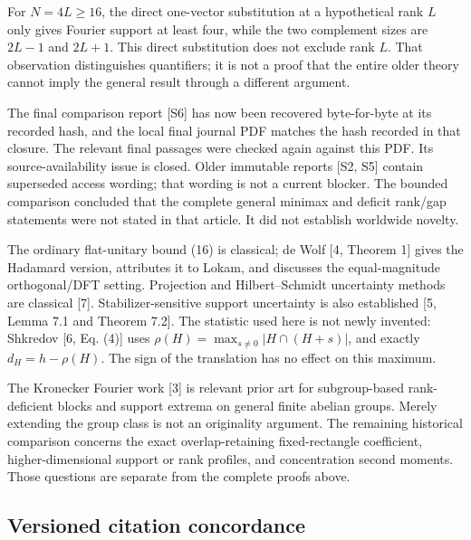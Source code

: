 \documentclass[
  11pt,
  letterpaper,
]{article}
\begin{document}
For \(N=4L\geq16\), the direct one-vector substitution at a hypothetical
rank \(L\) only gives Fourier support at least four, while the two
complement sizes are \(2L-1\) and \(2L+1\). This direct substitution
does not exclude rank \(L\). That observation distinguishes quantifiers;
it is not a proof that the entire older theory cannot imply the general
result through a different argument.

The final comparison report {[}S6{]} has now been recovered
byte-for-byte at its recorded hash, and the local final journal PDF
matches the hash recorded in that closure. The relevant final passages
were checked again against this PDF. Its source-availability issue is
closed. Older immutable reports {[}S2, S5{]} contain superseded access
wording; that wording is not a current blocker. The bounded comparison
concluded that the complete general minimax and deficit rank/gap
statements were not stated in that article. It did not establish
worldwide novelty.

The ordinary flat-unitary bound (16) is classical; de Wolf {[}4, Theorem
1{]} gives the Hadamard version, attributes it to Lokam, and discusses
the equal-magnitude orthogonal/DFT setting. Projection and
Hilbert--Schmidt uncertainty methods are classical {[}7{]}.
Stabilizer-sensitive support uncertainty is also established {[}5, Lemma
7.1 and Theorem 7.2{]}. The statistic used here is not newly invented:
Shkredov {[}6, Eq. (4){]} uses \(\rho(H)=\max_{s\neq0}|H\cap(H+s)|\),
and exactly \(d_H=h-\rho(H)\). The sign of the translation has no effect
on this maximum.

The Kronecker Fourier work {[}3{]} is relevant prior art for
subgroup-based rank-deficient blocks and support extrema on general
finite abelian groups. Merely extending the group class is not an
originality argument. The remaining historical comparison concerns the
exact overlap-retaining fixed-rectangle coefficient, higher-dimensional
support or rank profiles, and concentration second moments. Those
questions are separate from the complete proofs above.

\subsection{Versioned citation
concordance}\label{versioned-citation-concordance}
\end{document}
